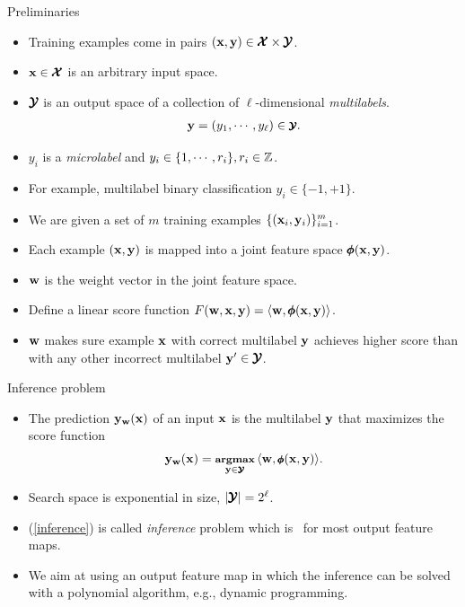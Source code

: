 \documentclass[first=dgreen,second=purple,logo=yellowexc]{aaltoslides}
\begin{document}
%
\begin{frame}{Preliminaries}
	\begin{itemize}\footnotesize
		\item Training examples come in pairs $(\mathbf {x},\mathbf {y})\in\pmb {\mathcal{X}}\times\pmb {\mathcal{Y}}$.
		\item $\mathbf {x}\in\pmb {\mathcal{X}}$ is an arbitrary input space.
		\item $\pmb {\mathcal{Y}}$ is an output space of a collection of $\ell$-dimensional {\em multilabels}.
		\begin{align*}\footnotesize
			\mathbf {y}=(y_1,\cdots,y_{\ell})\in\pmb {\mathcal{Y}}.
		\end{align*}
		\item $y_i$ is a {\em microlabel} and $y_i\in\{1,\cdots,r_i\}, r_i\in\mathbb{Z}$.
		\item For example, multilabel binary classification $y_i\in\{-1,+1\}$.
		\item We are given a set of $m$ training examples $\{(\mathbf {x}_i,\mathbf {y}_i)\}_{i=1}^m$.
		\item Each example $(\mathbf {x},\mathbf {y})$ is mapped into a joint feature space $\pmb \phi(\mathbf {x},\mathbf {y})$.
		\item $\mathbf {w}$ is the weight vector in the joint feature space.
		\item Define a linear score function $F(\mathbf {w},\mathbf {x},\mathbf {y}) = \langle \mathbf {w}, \pmb \phi(\mathbf {x},\mathbf {y}) \rangle$.
		\item $\mathbf {w}$ makes sure example $\mathbf {x}$ with correct multilabel $\mathbf {y}$ achieves higher score than with any other incorrect multilabel $\mathbf {y}'\in\pmb {\mathcal{Y}}$.
	\end{itemize}
\end{frame}

\begin{frame}{Inference problem}
	\begin{itemize}
		\item The prediction $\mathbf {y}_{\mathbf {w}}(\mathbf {x})$ of an input $\mathbf {x}$ is the multilabel $\mathbf {y}$ that maximizes the score function 
		\begin{align}\footnotesize
			\mathbf {y}_{\mathbf {w}}(\mathbf {x}) = \underset{\mathbf {y}\in\pmb {\mathcal{Y}}}{\textbf{argmax}}\,\langle \mathbf {w}, \pmb \phi(\mathbf {x},\mathbf {y}) \rangle. \label{inference}
		\end{align}
		\item Search space is exponential in size, $|\pmb {\mathcal{Y}}|=2^{\ell}$.
		\item (\ref{inference}) is called {\em inference} problem which is \nphard\ for most output feature maps.
		\item We aim at using an output feature map in which the inference can be solved with a polynomial algorithm, e.g., dynamic programming.
	\end{itemize}
\end{frame}
\end{document}
